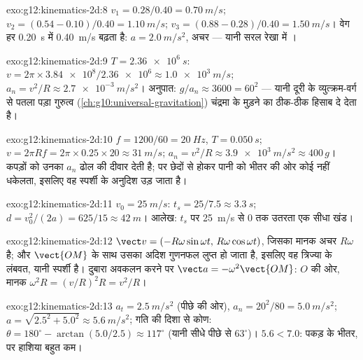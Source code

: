 \begin{solution}{exo:g12:kinematics-2d:8}
$v_1 = 0.28/0.40 = \qty{0.70}{m/s}$; $v_2 = (0.54 - 0.10)/0.40 = \qty{1.10}{m/s}$; $v_3 = (0.88 - 0.28)/0.40 = \qty{1.50}{m/s}$। वेग हर \qty{0.20}{s} में \qty{0.40}{m/s} बढ़ता है: $a = \qty{2.0}{m/s^2}$, अचर ---
यानी सरल रेखा में ।
\end{solution}

\begin{solution}{exo:g12:kinematics-2d:9}
$T = \qty{2.36e6}{s}$: $v = 2\pi \times \num{3.84e8}/\num{2.36e6}
\approx \qty{1.0e3}{m/s}$; $a_n = v^2/R \approx \qty{2.7e-3}{m/s^2}$। अनुपात: $g/a_n \approx 3600 = 60^2$ --- यानी दूरी के व्युत्क्रम-वर्ग से
पतला पड़ा गुरुत्व (\cref{ch:g10:universal-gravitation}) चंद्रमा के मुड़ने का ठीक-ठीक हिसाब दे देता है।
\end{solution}

\begin{solution}{exo:g12:kinematics-2d:10}
$f = 1200/60 = \qty{20}{Hz}$, $T = \qty{0.050}{s}$; $v = 2\pi R f = 2\pi \times 0.25 \times 20 \approx \qty{31}{m/s}$; $a_n = v^2/R \approx \qty{3.9e3}{m/s^2} \approx 400\,g$। कपड़ों को उनका $a_n$ ढोल की दीवार देती है;
पर छेदों से होकर पानी को भीतर की ओर कोई नहीं धकेलता, इसलिए वह स्पर्शी के
अनुदिश उड़ जाता है।
\end{solution}

\begin{solution}{exo:g12:kinematics-2d:11}
$v_0 = \qty{25}{m/s}$: $t_s = 25/7.5 \approx \qty{3.3}{s}$; $d = v_0^2/(2a) = 625/15 \approx \qty{42}{m}$। आलेख: $t_s$ पर \qty{25}{m/s} से $0$ तक उतरता एक सीधा
खंड।
\end{solution}

\begin{solution}{exo:g12:kinematics-2d:12}
$\vect v = (-R\omega\sin\omega t,\, R\omega\cos\omega t)$, जिसका मानक अचर $R\omega$ है; और $\vect{OM}$ के साथ उसका अदिश गुणनफल लुप्त हो
जाता है, इसलिए वह त्रिज्या के लंबवत, यानी स्पर्शी है। दुबारा अवकलन करने पर
$\vect a = -\omega^2\vect{OM}$: $O$ की ओर, मानक $\omega^2 R = (v/R)^2 R = v^2/R$।
\end{solution}

\begin{solution}{exo:g12:kinematics-2d:13}
$a_t = \qty{2.5}{m/s^2}$ (पीछे की ओर), $a_n = 20^2/80 =
\qty{5.0}{m/s^2}$; $a = \sqrt{2.5^2 + 5.0^2} \approx \qty{5.6}{m/s^2}$; गति की दिशा से कोण: $\theta = 180^\circ - \arctan(5.0/2.5) \approx 117^\circ$ (यानी सीधे
पीछे से $63^\circ$)। $5.6 < 7.0$: पकड़ के भीतर, पर हाशिया बहुत कम।
\end{solution}

